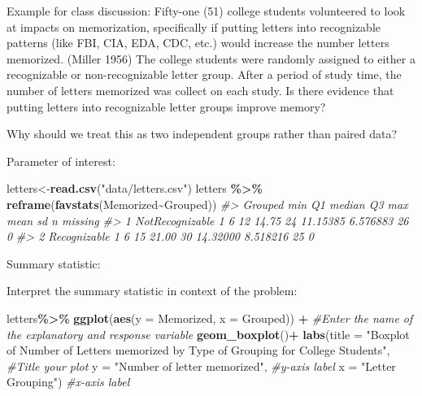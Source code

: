 \documentclass[
]{report}
\newenvironment{Shaded}{\begin{snugshade}}{\end{snugshade}}
\newcommand{\AttributeTok}[1]{\textcolor[rgb]{0.13,0.29,0.53}{#1}}
\newcommand{\CommentTok}[1]{\textcolor[rgb]{0.56,0.35,0.01}{\textit{#1}}}
\newcommand{\FunctionTok}[1]{\textcolor[rgb]{0.13,0.29,0.53}{\textbf{#1}}}
\newcommand{\NormalTok}[1]{#1}
\newcommand{\OtherTok}[1]{\textcolor[rgb]{0.56,0.35,0.01}{#1}}
\newcommand{\SpecialCharTok}[1]{\textcolor[rgb]{0.81,0.36,0.00}{\textbf{#1}}}
\newcommand{\StringTok}[1]{\textcolor[rgb]{0.31,0.60,0.02}{#1}}
\begin{document}

Example for class discussion: Fifty-one (51) college students volunteered to look at impacts on memorization, specifically if putting letters into recognizable patterns (like FBI, CIA, EDA, CDC, etc.) would increase the number letters memorized. (Miller 1956) The college students were randomly assigned to either a recognizable or non-recognizable letter group. After a period of study time, the number of letters memorized was collect on each study. Is there evidence that putting letters into recognizable letter groups improve memory?

Why should we treat this as two independent groups rather than paired data?

\vspace{0.6in}

Parameter of interest:

\vspace{0.8in}

\begin{Shaded}
\begin{Highlighting}[]
\NormalTok{letters}\OtherTok{\textless{}{-}}\FunctionTok{read.csv}\NormalTok{(}\StringTok{"data/letters.csv"}\NormalTok{)}
\NormalTok{letters }\SpecialCharTok{\%\textgreater{}\%}
    \FunctionTok{reframe}\NormalTok{(}\FunctionTok{favstats}\NormalTok{(Memorized}\SpecialCharTok{\textasciitilde{}}\NormalTok{Grouped))}
\CommentTok{\#\textgreater{}           Grouped min Q1 median    Q3 max     mean       sd  n missing}
\CommentTok{\#\textgreater{} 1 NotRecognizable   1  6     12 14.75  24 11.15385 6.576883 26       0}
\CommentTok{\#\textgreater{} 2    Recognizable   1  6     15 21.00  30 14.32000 8.518216 25       0}
\end{Highlighting}
\end{Shaded}

Summary statistic:

\vspace{0.4in}

Interpret the summary statistic in context of the problem:

\vspace{0.4in}

\begin{Shaded}
\begin{Highlighting}[]
\NormalTok{letters}\SpecialCharTok{\%\textgreater{}\%}
  \FunctionTok{ggplot}\NormalTok{(}\FunctionTok{aes}\NormalTok{(}\AttributeTok{y =}\NormalTok{ Memorized, }\AttributeTok{x =}\NormalTok{ Grouped))  }\SpecialCharTok{+} \CommentTok{\#Enter the name of the explanatory and response variable}
  \FunctionTok{geom\_boxplot}\NormalTok{()}\SpecialCharTok{+}
  \FunctionTok{labs}\NormalTok{(}\AttributeTok{title =} \StringTok{"Boxplot of Number of Letters memorized by Type }
\StringTok{       of Grouping for College Students"}\NormalTok{, }\CommentTok{\#Title your plot}
       \AttributeTok{y =} \StringTok{"Number of letter memorized"}\NormalTok{, }\CommentTok{\#y{-}axis label}
       \AttributeTok{x =} \StringTok{"Letter Grouping"}\NormalTok{) }\CommentTok{\#x{-}axis label}
\end{Highlighting}
\end{Shaded}
\end{document}
